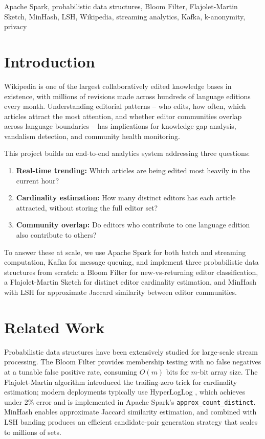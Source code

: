\documentclass[conference]{IEEEtran}
\begin{document}
\begin{IEEEkeywords}
Apache Spark, probabilistic data structures, Bloom Filter, Flajolet-Martin Sketch, MinHash, LSH, Wikipedia, streaming analytics, Kafka, k-anonymity, privacy
\end{IEEEkeywords}

\section{Introduction}

Wikipedia is one of the largest collaboratively edited knowledge bases in existence, with millions of revisions made across hundreds of language editions every month. Understanding editorial patterns -- who edits, how often, which articles attract the most attention, and whether editor communities overlap across language boundaries -- has implications for knowledge gap analysis, vandalism detection, and community health monitoring.

This project builds an end-to-end analytics system addressing three questions:
\begin{enumerate}
  \item \textbf{Real-time trending:} Which articles are being edited most heavily in the current hour?
  \item \textbf{Cardinality estimation:} How many distinct editors has each article attracted, without storing the full editor set?
  \item \textbf{Community overlap:} Do editors who contribute to one language edition also contribute to others?
\end{enumerate}

To answer these at scale, we use Apache Spark for both batch and streaming computation, Kafka for message queuing, and implement three probabilistic data structures from scratch: a Bloom Filter for new-vs-returning editor classification, a Flajolet-Martin Sketch for distinct editor cardinality estimation, and MinHash with LSH for approximate Jaccard similarity between editor communities.

\section{Related Work}

Probabilistic data structures have been extensively studied for large-scale stream processing. The Bloom Filter \cite{bloom1970} provides membership testing with no false negatives at a tunable false positive rate, consuming $O(m)$ bits for $m$-bit array size. The Flajolet-Martin algorithm \cite{flajolet1985} introduced the trailing-zero trick for cardinality estimation; modern deployments typically use HyperLogLog \cite{flajolet2007}, which achieves under 2\% error and is implemented in Apache Spark's \texttt{approx\_count\_distinct}. MinHash \cite{broder1997} enables approximate Jaccard similarity estimation, and combined with LSH banding \cite{indyk1998} produces an efficient candidate-pair generation strategy that scales to millions of sets.
\end{document}
